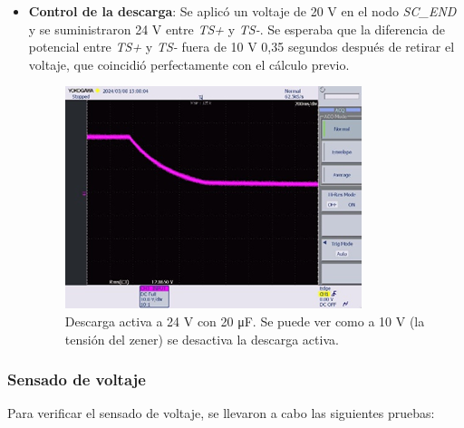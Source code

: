\begin{itemize}
	\item \textbf{Control de la descarga}: Se aplicó un voltaje de 20 V en el nodo \textit{SC\_END} y se suministraron 24 V entre \textit{TS+} y \textit{TS-}. Se esperaba que la diferencia de potencial entre \textit{TS+} y \textit{TS-} fuera de 10 V 0,35 segundos después de retirar el voltaje, que coincidió perfectamente con el cálculo previo.
	\begin{figure}[H]
		\centering
		\includegraphics[width=0.7\linewidth]{fig/discharge2}
		\caption{Descarga activa a 24 V con 20 \unit{\micro\farad}. Se puede ver como a 10 V (la tensión del zener) se desactiva la descarga activa.}
	\end{figure}
\end{itemize}
	
	
\subsubsection{Sensado de voltaje}

Para verificar el sensado de voltaje, se llevaron a cabo las siguientes pruebas:

